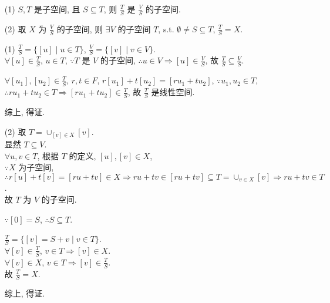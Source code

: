 \documentclass{note}
\begin{document}
\begin{thm}[(课本定理 3.3)]
    \begin{itemize}
        \item[(1)] $S,T$ 是子空间, 且 $S\subseteq T$, 则 $\frac{T}{S}$ 是 $\frac{V}{S}$ 的子空间.
        \item[(2)] 取 $X$ 为 $\frac{V}{S}$ 的子空间, 则 $\exists V$ 的子空间 $T$, s.t. $\emptyset\neq S\subseteq T$, $\frac{T}{S}=X$.
    \end{itemize}
\end{thm}
\begin{pf}
    \begin{itemize}
        \item[(1)] $\frac{T}{S}=\{[u]\mid u\in T\}$, $\frac{V}{S}=\{[v]\mid v\in V\}$.\\
        $\forall[u]\in\frac{T}{S}$, $u\in T$, $\because T$ 是 $V$ 的子空间, $\therefore u\in V\Longrightarrow[u]\in\frac{V}{S}$, 故 $\frac{T}{S}\subseteq\frac{V}{S}$.

        $\forall[u_1],[u_2]\in\frac{T}{S}$, $r,t\in F$, $r[u_1]+t[u_2]=[ru_1+tu_2]$, $\because u_1,u_2\in T$, $\therefore ru_1+tu_2\in T\Longrightarrow[ru_1+tu_2]\in\frac{T}{S}$, 故 $\frac{T}{S}$ 是线性空间.

        综上, 得证.
        \item[(2)] 取 $T=\cup_{[v]\in X}[v]$.\\
        显然 $T\subseteq V$.\\
        $\forall u,v\in T$, 根据 $T$ 的定义, $[u],[v]\in X$,\\
        $\because X$ 为子空间, $\therefore r[u]+t[v]=[ru+tv]\in X\Longrightarrow ru+tv\in[ru+tv]\subseteq T=\cup_{v\in X}[v]\Longrightarrow ru+tv\in T$.\\
        故 $T$ 为 $V$ 的子空间.

        $\because[0]=S$, $\therefore S\subseteq T$.

        $\frac{T}{S}=\{[v]=S+v\mid v\in T\}$.\\
        $\forall[v]\in\frac{T}{S}$, $v\in T\Longrightarrow[v]\in X$.\\
        $\forall[v]\in X$, $v\in T\Longrightarrow[v]\in\frac{T}{S}$.\\
        故 $\frac{T}{S}=X$.

        综上, 得证.
    \end{itemize}
\end{pf}
\end{document}

